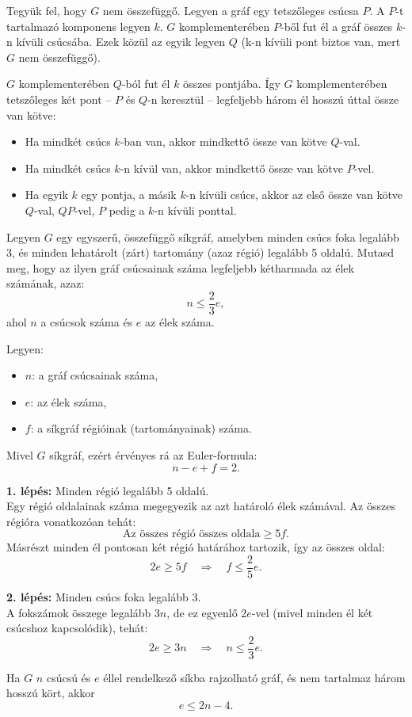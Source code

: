 \begin{solution}
	Tegyük fel, hogy $G$ nem összefüggő. Legyen a gráf egy tetszőleges
	csúcsa $P$. A $P$-t tartalmazó komponens legyen $k$. $G$ komplementerében
	$P$-ből fut él a gráf összes $k$-n kívüli csúcsába. Ezek közül az
	egyik legyen $Q$ (k-n kívüli pont biztos van, mert $G$ nem összefüggő).
	
	$G$ komplementerében $Q$-ból fut él $k$ összes pontjába. Így $G$
	komplementerében tetszőleges két pont -- $P$ és $Q$-n keresztül
	-- legfeljebb három él hosszú úttal össze van kötve:
	\begin{itemize}
		\item Ha mindkét csúcs $k$-ban van, akkor mindkettő össze van kötve $Q$-val. 
		\item Ha mindkét csúcs $k$-n kívül van, akkor mindkettő össze van kötve
		$P$-vel. 
		\item Ha egyik $k$ egy pontja, a másik $k$-n kívüli csúcs, akkor az első
		össze van kötve $Q$-val, $QP$-vel, $P$ pedig a $k$-n kívüli ponttal. 
	\end{itemize}
\end{solution}
\begin{problem}
	Legyen $G$ egy egyszerű, összefüggő síkgráf, amelyben minden csúcs
	foka legalább 3, és minden lehatárolt (zárt) tartomány (azaz régió)
	legalább 5 oldalú. Mutasd meg, hogy az ilyen gráf csúcsainak száma
	legfeljebb kétharmada az élek számának, azaz: 
	\[
	n\leq\frac{2}{3}e,
	\]
	ahol $n$ a csúcsok száma és $e$ az élek száma. 
\end{problem}

\begin{solution}
	Legyen: 
	\begin{itemize}
		\item $n$: a gráf csúcsainak száma, 
		\item $e$: az élek száma, 
		\item $f$: a síkgráf régióinak (tartományainak) száma. 
	\end{itemize}
	Mivel $G$ síkgráf, ezért érvényes rá az Euler-formula: 
	\[
	n-e+f=2.
	\]
	
	\textbf{1. lépés:} Minden régió legalább 5 oldalú. \\
	Egy régió oldalainak száma megegyezik az azt határoló élek számával.
	Az összes régióra vonatkozóan tehát: 
	\[
	\text{Az összes régió összes oldala}\geq5f.
	\]
	Másrészt minden él pontosan két régió határához tartozik, így az összes
	oldal: 
	\[
	2e\geq5f\quad\Rightarrow\quad f\leq\frac{2}{5}e.
	\]
	
	\textbf{2. lépés:} Minden csúcs foka legalább 3. \\
	A fokszámok összege legalább $3n$, de ez egyenlő $2e$-vel (mivel
	minden él két csúcshoz kapcsolódik), tehát: 
	\[
	2e\geq3n\quad\Rightarrow\quad n\leq\frac{2}{3}e.
	\]
\end{solution}
\begin{problem}
	Ha $G$ $n$ csúcsú és $e$ éllel rendelkező síkba rajzolható gráf,
	és nem tartalmaz három hosszú kört, akkor 
	\[
	e\leq2n-4.
	\]
\end{problem}

